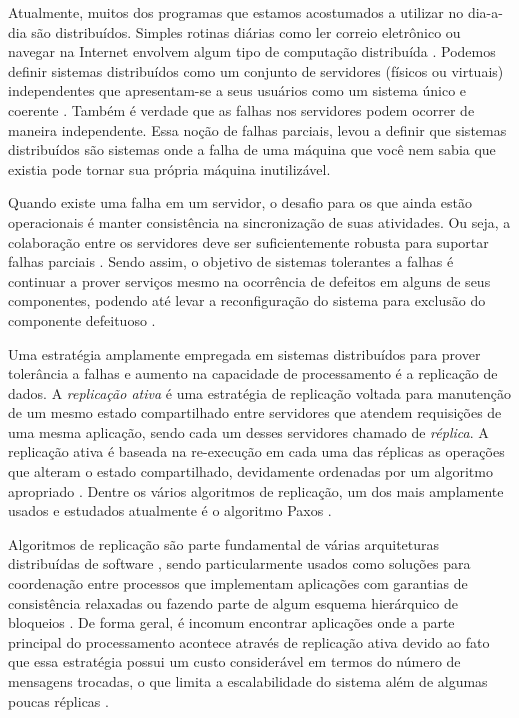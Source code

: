Atualmente, muitos dos programas que estamos acostumados a utilizar no dia-a-dia são
distribuídos. Simples rotinas diárias como ler correio eletrônico ou navegar na Internet
envolvem algum tipo de computação distribuída \cite{cachin11}. Podemos definir sistemas
distribuídos como um conjunto de servidores (físicos ou virtuais) independentes que
apresentam-se a seus usuários como um sistema único e coerente \cite{tanenbaum07}. Também
é verdade que as falhas nos servidores podem ocorrer de maneira independente. Essa noção
de falhas parciais, levou  a definir que sistemas distribuídos são
sistemas onde a falha de uma máquina que você nem sabia que existia pode tornar sua
própria máquina inutilizável.

Quando existe uma falha em um servidor, o desafio para os que ainda estão operacionais é
manter consistência na sincronização de suas atividades. Ou seja, a colaboração entre os
servidores deve ser suficientemente robusta para suportar falhas parciais \cite{cachin11}.
Sendo assim, o objetivo de sistemas tolerantes a falhas é continuar a prover serviços
mesmo na ocorrência de defeitos em alguns de seus componentes, podendo até levar a
reconfiguração do sistema para exclusão do componente defeituoso \cite{tanenbaum07}.

Uma estratégia amplamente empregada em sistemas distribuídos para prover tolerância a
falhas e aumento na capacidade de processamento é a replicação de dados. A
\emph{replicação ativa} \cite{schneider90} é uma estratégia de replicação voltada para
manutenção de um mesmo estado compartilhado entre servidores que atendem requisições de
uma mesma aplicação, sendo cada um desses servidores chamado de \emph{réplica}. A
replicação ativa é baseada na re-execução em cada uma das réplicas as operações que
alteram o estado compartilhado, devidamente ordenadas por um algoritmo apropriado
\cite{schneider90}. Dentre os vários algoritmos de replicação, um dos mais amplamente
usados e estudados atualmente é o algoritmo Paxos \cite{lamport98}.

Algoritmos de replicação são parte fundamental de várias arquiteturas distribuídas de
software \cite{chandra07, hupfeld08b, maccormick04}, sendo particularmente usados como
soluções para coordenação entre processos que implementam aplicações com garantias de
consistência relaxadas \cite{burrows06} ou fazendo parte de algum esquema hierárquico de
bloqueios \cite{lampson96}. De forma geral, é incomum encontrar aplicações onde a parte
principal do processamento acontece através de replicação ativa devido ao fato que essa
estratégia possui um custo considerável em termos do número de mensagens trocadas, o que
limita a escalabilidade do sistema além de algumas poucas réplicas \cite{lampson96}.

